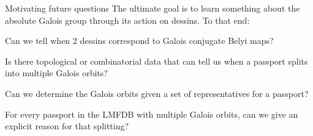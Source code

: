 \documentclass{beamer}
\begin{document}
\begin{frame}[plain]{Motivating future questions}
The ultimate goal is to learn something about the absolute Galois group through its action on dessins.
To that end:
\begin{vfilleditems}
  \item Can we tell when 2 dessins correspond to Galois conjugate Belyi maps?
  \item Is there topological or combinatorial data that can tell us when a passport splits into multiple Galois orbits?
  \item Can we determine the Galois orbits given a set of representatives for a passport?
  \item For every passport in the LMFDB with multiple Galois orbits, can we give an explicit reason for that splitting?
\end{vfilleditems}

\end{frame}
\end{document}
